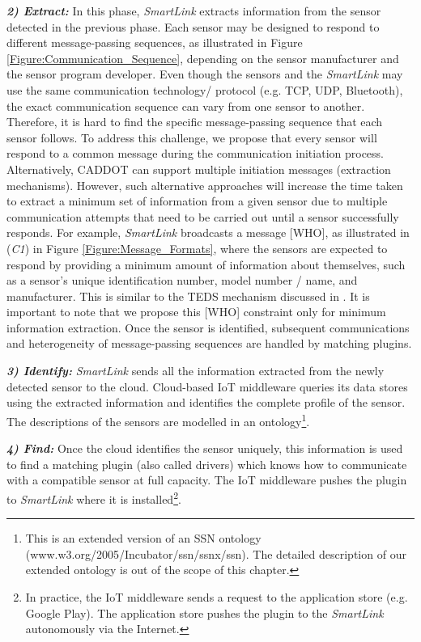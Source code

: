 \documentclass[graybox]{svmult}
\begin{document}
\textit{\textbf{2) Extract:}} In this phase, \textit{SmartLink} extracts information from the sensor detected in the previous phase. Each sensor may be designed to respond to different message-passing sequences, as illustrated in Figure \ref{Figure:Communication_Sequence}, depending on the sensor manufacturer and the sensor program developer. Even though the sensors and the \textit{SmartLink} may use the same communication technology/ protocol (e.g. TCP, UDP, Bluetooth), the exact communication sequence can vary from one sensor to another. Therefore, it is hard to find the specific message-passing sequence that each sensor follows. To address this challenge, we propose that every sensor will respond to a common message during the communication initiation process. Alternatively, CADDOT can support multiple initiation messages (extraction mechanisms). However, such alternative approaches will increase the time taken to extract a minimum set of information from a given sensor due to multiple communication attempts that need to be carried out until a sensor successfully responds. For example, \textit{SmartLink} broadcasts a message [WHO], as illustrated in (\textit{C1}) in Figure \ref{Figure:Message_Formats}, where the sensors are expected  to respond by providing a minimum amount of information about themselves, such as a sensor's unique identification number, model number / name, and manufacturer. This is similar to the TEDS mechanism discussed in \cite{P339}. It is important to note that we propose this [WHO] constraint only for minimum information extraction. Once the sensor is identified, subsequent communications and heterogeneity of message-passing sequences are handled by matching plugins.







\textit{\textbf{3) Identify:}} \textit{SmartLink} sends all the information extracted from the newly detected sensor to the cloud. Cloud-based IoT middleware queries its data stores using the extracted information and identifies the complete profile of the sensor. The descriptions of the sensors are modelled in an ontology\footnote{This is an extended version of an SSN ontology (www.w3.org/2005/Incubator/ssn/ssnx/ssn). The detailed description of our extended ontology is out of the scope of this chapter.}.




\textit{\textbf{4) Find:}} Once the cloud identifies the sensor uniquely, this information is used to find a matching plugin (also called drivers) which knows how to communicate with a compatible sensor at full capacity. The IoT middleware pushes the plugin to \textit{SmartLink} where it is installed\footnote{In practice, the IoT middleware sends a request to the application store (e.g. Google Play). The application store pushes the plugin to the \textit{SmartLink} autonomously via the Internet.}.
\end{document}
